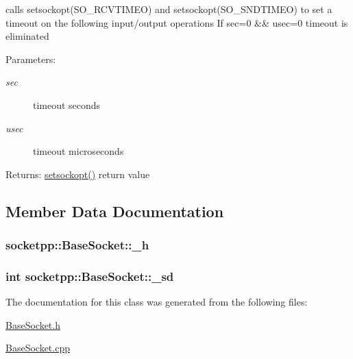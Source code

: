 calls setsockopt(SO\_\-RCVTIMEO) and setsockopt(SO\_\-SNDTIMEO) to set a timeout on the following input/output operations If sec=0 \&\& usec=0 timeout is eliminated 

\begin{Desc}
\item[Parameters:]
\begin{description}
\item[{\em sec}]timeout seconds \item[{\em usec}]timeout microseconds \end{description}
\end{Desc}
\begin{Desc}
\item[Returns:]\hyperlink{classsocketpp_1_1BaseSocket_3f1f168e4953c046bb1159941da2fa30}{setsockopt()} return value \end{Desc}


\subsection{Member Data Documentation}
\hypertarget{classsocketpp_1_1BaseSocket_1e44e3c6c2ecd89c2aa716cc62528620}{
\subsubsection[{\_\-h}]{ {\bf socketpp::BaseSocket::\_\-h}}}
\label{classsocketpp_1_1BaseSocket_1e44e3c6c2ecd89c2aa716cc62528620}


\hypertarget{classsocketpp_1_1BaseSocket_a5ef6b5fabb3988bced6a23d9631985d}{
\subsubsection[{\_\-sd}]{\setlength{\rightskip}{0pt plus 5cm}int {\bf socketpp::BaseSocket::\_\-sd}}}
\label{classsocketpp_1_1BaseSocket_a5ef6b5fabb3988bced6a23d9631985d}




The documentation for this class was generated from the following files:\begin{CompactItemize}
\item 
\hyperlink{BaseSocket_8h}{BaseSocket.h}\item 
\hyperlink{BaseSocket_8cpp}{BaseSocket.cpp}\end{CompactItemize}
